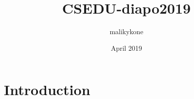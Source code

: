 \documentclass{article}
\title{CSEDU-diapo2019}
\author{malikykone }
\date{April 2019}
\begin{document}
\maketitle

\section{Introduction}
\end{document}
